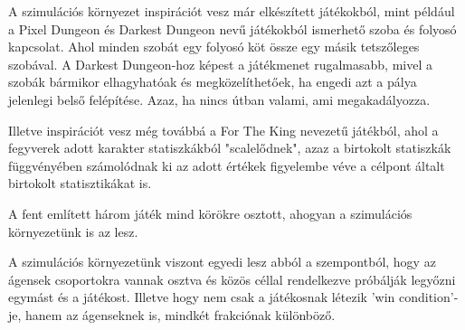 

A szimulációs környezet inspirációt vesz már elkészített játékokból, mint például a Pixel Dungeon és Darkest Dungeon
nevű játékokból ismerhető szoba és folyosó kapcsolat. Ahol minden szobát egy folyosó köt össze egy másik tetszőleges szobával.
A Darkest Dungeon-hoz képest a játékmenet rugalmasabb, mivel a szobák bármikor elhagyhatóak és megközelíthetőek, ha engedi azt a pálya jelenlegi belső felépítése.
Azaz, ha nincs útban valami, ami megakadályozza.

Illetve inspirációt vesz még továbbá a For The King nevezetű játékból, ahol a fegyverek adott karakter statiszkákból "scalelődnek", azaz a birtokolt statiszkák függvényében
számolódnak ki az adott értékek figyelembe véve a célpont általt birtokolt statisztikákat is.

A fent említett három játék mind körökre osztott, ahogyan a szimulációs környezetünk is az lesz.

A szimulációs környezetünk viszont egyedi lesz abból a szempontból, hogy az ágensek csoportokra vannak osztva és közös céllal rendelkezve próbálják legyőzni egymást és a játékost.
Illetve hogy nem csak a játékosnak létezik 'win condition'-je, hanem az ágenseknek is, mindkét frakciónak különböző.

